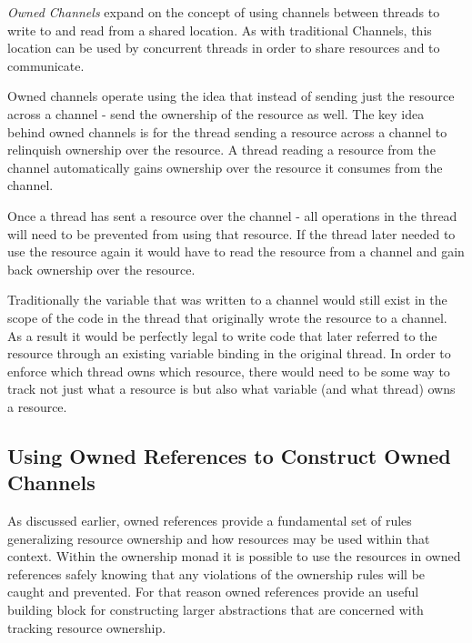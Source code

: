 \documentclass[onehalf,11pt]{beavtex}
\begin{document}
\textit{Owned Channels} expand on the concept of using channels between threads
to write to and read from a shared location.   As with traditional Channels,
this location can be used by concurrent threads in order to share resources and
to communicate.


Owned channels operate using the idea that instead of sending just the
resource across a channel - send the ownership of the resource as well.
The key idea behind owned channels is for the thread sending a
resource across a channel to relinquish ownership over the resource.
A thread reading a resource from the channel automatically gains ownership over
the resource it consumes from the channel.

Once a thread has sent a resource over the channel - all operations in the thread
will need to be prevented from using that resource.
If the thread later needed to use the resource again it would have to read the
resource from a channel and gain back ownership over the resource.

Traditionally the variable that was written to a channel would still exist in the
scope of the code in the thread that originally wrote the resource to a channel.
As a result it would be perfectly legal to write code that later referred to the
resource through an existing variable binding in the original thread.
In order to enforce which thread owns which resource, there would need to be
some way to track not just what a resource is but also what variable (and what
thread) owns a resource.

\subsection{Using Owned References to Construct Owned Channels}

As discussed earlier, owned references provide a fundamental set of
rules generalizing resource ownership and how resources may be used within that
context.  Within the ownership monad it is possible to use the
resources in owned references safely knowing that any violations of
the ownership rules will be caught and prevented.  For that reason
owned references provide an useful building block for constructing
larger abstractions that are concerned with tracking resource ownership.
\end{document}
